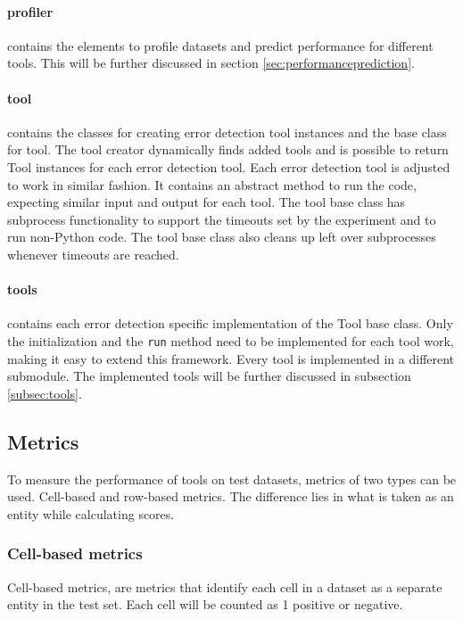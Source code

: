 \paragraph{profiler} contains the elements to profile datasets and predict performance for different tools. This will be further discussed in section \ref{sec:performanceprediction}.

\paragraph{tool} contains the classes for creating error detection tool instances and the base class for tool. The tool creator dynamically finds added tools and is possible to return Tool instances for each error detection tool. Each error detection tool is adjusted to work in similar fashion. It contains an abstract method to run the code, expecting similar input and output for each tool. The tool base class has subprocess functionality to support the timeouts set by the experiment and to run non-Python code. The tool base class also cleans up left over subprocesses whenever timeouts are reached. 

\paragraph{tools} contains each error detection specific implementation of the Tool base class. Only the initialization and the \verb|run| method need to be implemented for each tool work, making it easy to extend this framework. Every tool is implemented in a different submodule. The implemented tools will be further discussed in subsection \ref{subsec:tools}. 



\subsection{Metrics}
\label{subsec:metrics}
To measure the performance of tools on test datasets, metrics of two types can be used. Cell-based and row-based metrics. The difference lies in what is taken as an entity while calculating scores.

\subsubsection{Cell-based metrics}
Cell-based metrics, are metrics that identify each cell in a dataset as a separate entity in the test set. Each cell will be counted as 1 positive or negative. 

